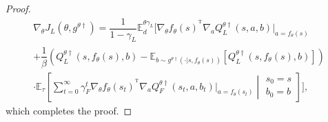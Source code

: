 \documentclass[letterpaper]{article} %
\providecommand{\E}{\mathbb{E}} %
\providecommand{\T}{\ensuremath{^{\mathrm{T}}}} %
\begin{document}
\begin{proof}
\begin{multline*}
    \nabla_{\theta}J_L(\theta,g^{\theta\dagger})
    =\dfrac{1}{1-\gamma_L}\E_d^{\theta\gamma_L}\Bigg[\nabla_{\theta}f_{\theta}(s)^{\T}\nabla_{a}Q_L^{\theta\dagger}(s,a,b)|_{a=f_{\theta}(s)}\\
    +\dfrac{1}{\beta}\left(Q_L^{\theta\dagger}(s,f_{\theta}(s),b)-\E_{b\sim g^{\theta\dagger}(\cdot|s,f_{\theta}(s))}\left[Q_L^{\theta\dagger}(s,f_{\theta}(s),b)\right]\right)\\
    \cdot\E_{\tau}\left[\sum_{t=0}^\infty \gamma_F^t\nabla_{\theta}f_{\theta}(s_t)^{\T}\nabla_{a}Q_F^{\theta\dagger}(s_t,a,b_t)\big|_{a=f_{\theta}(s_t)}\middle|\begin{array}{l}s_0=s\\b_0=b\end{array}\right]\Bigg],
\end{multline*}
which completes the proof.

\end{proof}
\end{document}
